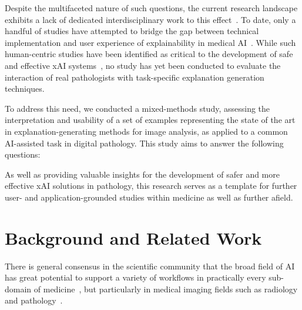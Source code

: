 Despite the multifaceted nature of such questions, the current research landscape exhibits a lack of dedicated interdisciplinary work to this effect~\cite{antoniadi2021current}. To date, only a handful of studies have attempted to bridge the gap between technical implementation and user experience of explainability in medical AI~\cite{liao2020questioning,cai2019hello,wang_designing_2019}. While such human-centric studies have been identified as critical to the development of safe and effective xAI systems~\cite{doshi2017towards, regitnig_expectations_2020, antoniadi2021current}, no study has yet been conducted to evaluate the interaction of real pathologists with task-specific explanation generation techniques.



To address this need, we conducted a mixed-methods study, assessing the interpretation and usability of a set of examples representing the state of the art in explanation-generating methods for image analysis, as applied to a common AI-assisted task in digital pathology. This study aims to answer the following questions:

\researchquestions

As well as providing valuable insights for the development of safer and more effective xAI solutions in pathology, this research serves as a template for further user- and application-grounded studies within medicine as well as further afield.

\section{Background and Related Work}

There is general consensus in the scientific community that the broad field of AI has great potential to support a variety of workflows in practically every sub-domain of medicine~\cite{hamet2017artificial}, but particularly in medical imaging fields such as radiology and pathology~\cite{WulczynEtAl:2021:AImed-example}.

